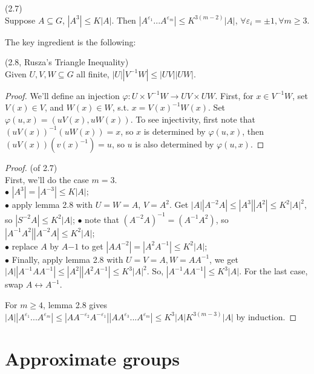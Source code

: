 \documentclass[a4paper]{article}
\begin{document}
\begin{prop} (2.7)\\
    Suppose $A \subseteq G$, $|A^3| \leq K|A|$. Then $|A^{\varepsilon_1} ... A^{\varepsilon_m}| \leq K^{3(m-2)} |A|$, $\forall \varepsilon_i =\pm 1, \forall m \geq 3$.
\end{prop}

The key ingredient is the following:

\begin{lemma} (2.8, Rusza's Triangle Inequality)\\
    Given $U,V,W \subseteq G$ all finite, $|U| |V^{-1} W| \leq |UV||UW|$.
    \begin{proof}
        We'll define an injection $\varphi:U \times V^{-1} W \to UV \times UW$. First, for $x \in V^{-1} W$, set $V(x) \in V$, and $W(x) \in W$, s.t. $x=V(x)^{-1} W(x)$. Set $\varphi(u,x) = (uV(x),uW(x))$. To see injectivity, first note that $(uV(x))^{-1} (uW(x)) = x$, so $x$ is determined by $\varphi(u,x)$, then $(uV(x))(v(x)^{-1}) = u$, so $u$ is also determined by $\varphi(u,x)$.
    \end{proof}
\end{lemma}

\begin{proof} (of 2.7)\\
    First, we'll do the case $m=3$.\\
    $\bullet$ $|A^3| = |A^{-3}| \leq K|A|$;\\
    $\bullet$ apply lemma 2.8 with $U=W=A$, $V=A^2$. Get $|A||A^{-2}A|\leq |A^3| |A^2| \leq K^2|A|^2$, so $|S^{-2}A| \leq K^2 |A|$;
    $\bullet$ note that $(A^{-2}A)^{-1} = (A^{-1}A^2)$, so $|A^{-1}A^2||A^{-2}A| \leq K^2|A|$;\\
    $\bullet$ replace $A$ by $A{-1}$ to get $|AA^{-2}| = |A^2 A^{-1}| \leq K^2|A|$;\\
    $\bullet$ Finally, apply lemma 2.8 with $U=V=A, W=AA^{-1}$, we get $|A||A^{-1}AA^{-1}| \leq |A^2||A^2 A^{-1}| \leq K^3 |A|^2$. So, $|A^{-1} AA^{-1}| \leq K^3 |A|$. For the last case, swap $A \leftrightarrow A^{-1}$.

    For $m \geq 4$, lemma 2.8 gives $|A||A^{\varepsilon_1} ... A^{\varepsilon_m}| \leq |AA^{-\varepsilon_2} A^{-\varepsilon_1}| |AA^{\varepsilon_3}...A^{\varepsilon_m}| \leq K^3|A| K^{3(m-3)}|A|$ by induction.
\end{proof}

\newpage

\section{Approximate groups}
\end{document}
